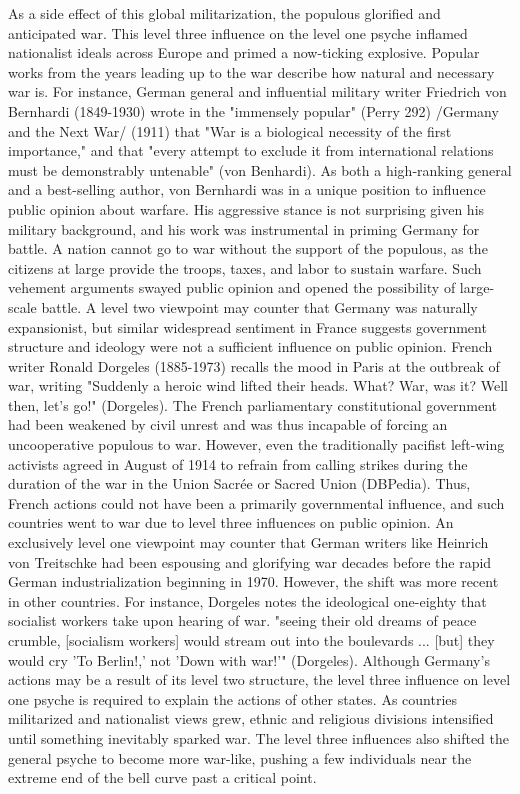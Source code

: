 \documentclass[11pt]{article}
\begin{document}
\begin{doublespacing}

As a side effect of this global militarization, the populous glorified and anticipated war. This level three influence on the level one psyche inflamed nationalist ideals across Europe and primed a now-ticking explosive.
Popular works from the years leading up to the war describe how natural and necessary war is.
For instance, German general and influential military writer Friedrich von Bernhardi (1849-1930) wrote in the "immensely popular" (Perry 292) /Germany and the Next War/ (1911) that "War is a biological necessity of the first importance," and that "every attempt to exclude it from international relations must be demonstrably untenable" (von Benhardi).
As both a high-ranking general and a best-selling author, von Bernhardi was in a unique position to influence public opinion about warfare. His aggressive stance is not surprising given his military background, and his work was instrumental in priming Germany for battle. A nation cannot go to war without the support of the populous, as the citizens at large provide the troops, taxes, and labor to sustain warfare. Such vehement arguments swayed public opinion and opened the possibility of large-scale battle.
A level two viewpoint may counter that Germany was naturally expansionist, but similar widespread sentiment in France suggests government structure and ideology were not a sufficient influence on public opinion. French writer Ronald Dorgeles (1885-1973) recalls the mood in Paris at the outbreak of war, writing "Suddenly a heroic wind lifted their heads. What? War, was it? Well then, let's go!" (Dorgeles).
The French parliamentary constitutional government had been weakened by civil unrest and was thus incapable of forcing an uncooperative populous to war. However, even the traditionally pacifist left-wing activists agreed in August of 1914 to refrain from calling strikes during the duration of the war in the Union Sacrée or Sacred Union (DBPedia). Thus, French actions could not have been a primarily governmental influence, and such countries went to war due to level three influences on public opinion.
An exclusively level one viewpoint may counter that German writers like Heinrich von Treitschke had been espousing and glorifying war decades before the rapid German industrialization beginning in 1970. However, the shift was more recent in other countries. For instance, Dorgeles notes the ideological one-eighty that socialist workers take upon hearing of war. "seeing their old dreams of peace crumble, [socialism workers] would stream out into the boulevards ... [but] they would cry 'To Berlin!,' not 'Down with war!'" (Dorgeles). Although Germany's actions may be a result of its level two structure, the level three influence on level one psyche is required to explain the actions of other states.
As countries militarized and nationalist views grew, ethnic and religious divisions intensified until something inevitably sparked war.
The level three influences also shifted the general psyche to become more war-like, pushing a few individuals near the extreme end of the bell curve past a critical point.

	\end{doublespacing}
\end{document}
